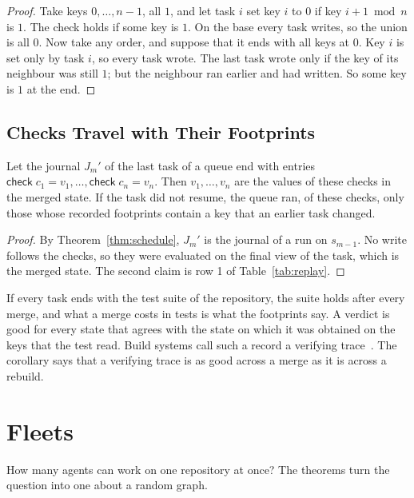\documentclass[acmsmall,nonacm,screen]{acmart}
\newcommand{\kw}[1]{\mathsf{#1}}
\newcommand{\chk}[1]{\kw{check}\;#1}
\begin{document}
\begin{proof}
Take keys $0, \ldots, n - 1$, all $1$, and let task $i$ set key $i$ to $0$ if key
$i + 1 \bmod n$ is $1$. The check holds if some key is $1$. On the base every task writes,
so the union is all $0$. Now take any order, and suppose that it ends with all keys at $0$.
Key $i$ is set only by task $i$, so every task wrote. The last task wrote only if the key of
its neighbour was still $1$; but the neighbour ran earlier and had written. So some key is
$1$ at the end.
\end{proof}

\subsection{Checks Travel with Their Footprints}

\begin{corollary}[Checks]
\label{cor:checks}
Let the journal $J_m'$ of the last task of a queue end with entries
$\chk{c_1} = v_1, \ldots, \chk{c_n} = v_n$. Then $v_1, \ldots, v_n$ are the values of these
checks in the merged state. If the task did not resume, the queue ran, of these checks, only
those whose recorded footprints contain a key that an earlier task changed.
\end{corollary}

\begin{proof}
By Theorem~\ref{thm:schedule}, $J_m'$ is the journal of a run on $s_{m-1}$. No write follows
the checks, so they were evaluated on the final view of the task, which is the merged state.
The second claim is row 1 of Table~\ref{tab:replay}.
\end{proof}

If every task ends with the test suite of the repository, the suite holds after every merge,
and what a merge costs in tests is what the footprints say. A verdict is good for every
state that agrees with the state on which it was obtained on the keys that the test read.
Build systems call such a record a verifying trace~\citep{mokhov2018}. The corollary says
that a verifying trace is as good across a merge as it is across a rebuild.

\section{Fleets}
\label{sec:fleet}

How many agents can work on one repository at once? The theorems turn the question into one
about a random graph.
\end{document}
